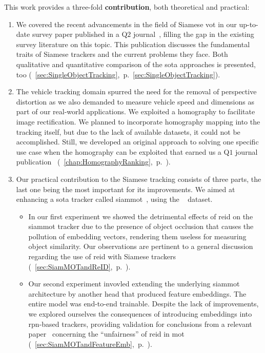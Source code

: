This work provides a three-fold \textbf{contribution}, both theoretical and practical:
\begin{enumerate}
    \item We covered the recent advancements in the field of Siamese \gls{vot} in our up-to-date survey paper published in a Q$2$ journal~\cite{ondrasovic2021siamese}, filling the gap in the existing survey literature on this topic. This publication discusses the fundamental traits of Siamese trackers and the current problems they face. Both qualitative and quantitative comparison of the \gls{sota} approaches is presented, too (\sectiontext{}~\ref{sec:SingleObjectTracking},~p.~\ref{sec:SingleObjectTracking}).
    \item The vehicle tracking domain spurred the need for the removal of perspective distortion as we also demanded to measure vehicle speed and dimensions as part of our real-world applications. We exploited a homography to facilitate image rectification. We planned to incorporate homography mapping into the tracking itself, but due to the lack of available datasets, it could not be accomplished. Still, we developed an original approach to solving one specific use case when the homography can be exploited that earned us a Q$1$ journal publication~\cite{ondrasovic2021homography} (\chaptertext{}~\ref{chap:HomographyRanking},~p.~\pageref{chap:HomographyRanking}).
    \item Our practical contribution to the Siamese tracking consists of three parts, the last one being the most important for its improvements. We aimed at enhancing a \gls{sota} tracker called \gls{siammot}~\cite{shuai2021siammot}, using the \uadetrac{}~\cite{wen2020uadetrac} dataset.
          \begin{itemize}
              \item In our first experiment we showed the detrimental effects of \gls{reid} on the \gls{siammot} tracker due to the presence of object occlusion that causes the pollution of embedding vectors, rendering them useless for measuring object similarity. Our observations are pertinent to a general discussion regarding the use of \gls{reid} with Siamese trackers (\sectiontext{}~\ref{sec:SiamMOTandReID},~p.~\pageref{sec:SiamMOTandReID}).
              \item Our second experiment invovled extending the underlying \gls{siammot} architecture by another head that produced feature embeddings. The entire model was end-to-end trainable. Despite the lack of improvements, we explored ourselves the consequences of introducing embeddings into \gls{rpn}-based trackers, providing validation for conclusions from a relevant paper~\cite{zhang2021fairmot} concerning the ``unfairness'' of \gls{reid} in \gls{mot} (\sectiontext{}~\ref{sec:SiamMOTandFeatureEmb},~p.~\pageref{sec:SiamMOTandFeatureEmb}).

\end{itemize}
\end{enumerate}
